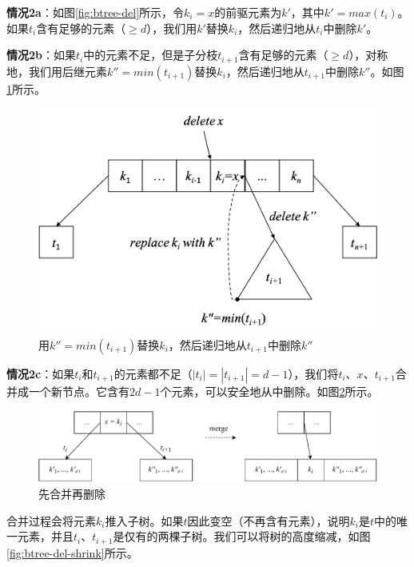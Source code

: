 \documentclass[b5paper]{ctexart}
\begin{document}
\textbf{情况2a}：如图\ref{fig:btree-del}所示，令$k_i = x$的前驱元素为$k'$，其中$k' = max(t_i)$。如果$t_i$含有足够的元素（$\geq d$），我们用$k'$替换$k_i$，然后递归地从$t_i$中删除$k'$。

\textbf{情况2b}：如果$t_i$中的元素不足，但是子分枝$t_{i+1}$含有足够的元素（$\geq d$），对称地，我们用后继元素$k'' = min(t_{i+1})$替换$k_i$，然后递归地从$t_{i+1}$中删除$k''$。如图\ref{fig:btree-del-case2b}所示。

\begin{figure}[htbp]
  \centering
  \includegraphics[scale=0.5]{img/btree-del-case2b}
  \caption{用$k'' = min(t_{i+1})$替换$k_i$，然后递归地从$t_{i+1}$中删除$k''$}
  \label{fig:btree-del-case2b}
\end{figure}

\textbf{情况2c}：如果$t_i$和$t_{i+1}$的元素都不足（$|t_i| = |t_{i+1}| = d - 1$），我们将$t_i$、$x$、$t_{i+1}$合并成一个新节点。它含有$2d - 1$个元素，可以安全地从中删除。如图\ref{fig:btree-del-merge}所示。

\begin{figure}[htbp]
  \centering
  \includegraphics[scale=0.65]{img/btree-del-merge}
  \caption{先合并再删除}
  \label{fig:btree-del-merge}
\end{figure}

合并过程会将元素$k_i$推入子树。如果$t$因此变空（不再含有元素），说明$k_i$是$t$中的唯一元素，并且$t_i$、$t_{i+1}$是仅有的两棵子树。我们可以将树的高度缩减，如图\ref{fig:btree-del-shrink}所示。
\end{document}

